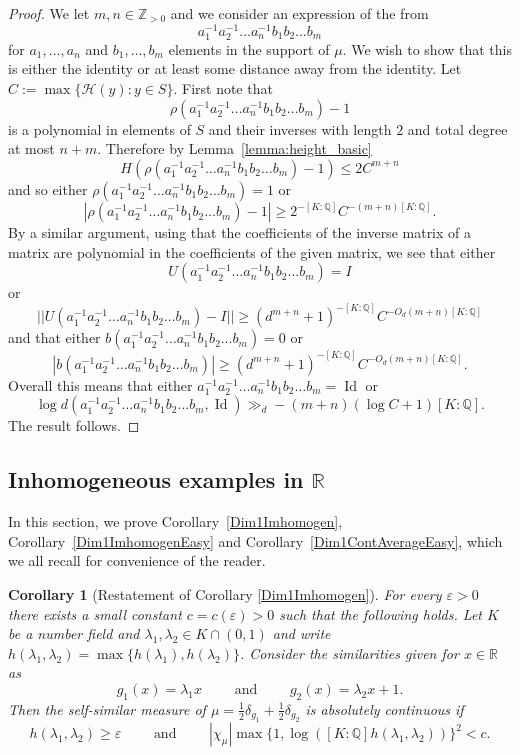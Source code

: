 \documentclass[10pt, english,oneside,reqno]{amsart}
\newtheorem*{corollary*}{Corollary}
\theoremstyle{plain}
\theoremstyle{remark}
\numberwithin{equation}{section}
\numberwithin{figure}{section}
\DeclareMathOperator{\id}{Id}
\newcommand{\eps}{\varepsilon}
\newcommand{\Q}{\mathbb{Q}}
\newcommand{\R}{\mathbb{R}}
\begin{document}
\begin{proof}
    We let $m, n \in \mathbb{Z}_{>0}$ and we consider an expression of the from $$a_1^{-1} a_2^{-1} \dots a_n^{-1} b_1 b_2 \dots b_m$$ for $a_1, \ldots , a_n$ and $b_1, \ldots , b_m$ elements in the support of $\mu$. We wish to show that this is either the identity or at least some distance away from the identity. Let $C := \max\{\mathcal{H}(y) : y \in S \}$. First note that $$\rho(a_1^{-1} a_2^{-1} \dots a_n^{-1} b_1 b_2 \dots b_m) - 1$$ is a polynomial in elements of $S$ and their inverses with length $2$ and total degree at most $n+m$. Therefore by Lemma~\ref{lemma:height_basic} $$H(\rho(a_1^{-1} a_2^{-1} \dots a_n^{-1} b_1 b_2 \dots b_m) - 1) \leq 2 C^{m+n}$$
		and so either $\rho(a_1^{-1} a_2^{-1} \dots a_n^{-1} b_1 b_2 \dots b_m) = 1$ or $$|\rho(a_1^{-1} a_2^{-1} \dots a_n^{-1} b_1 b_2 \dots b_m) - 1| \geq 2^{-[K:\mathbb{Q}]} C^{-(m+n)[K:\mathbb{Q}]}.$$
		By a similar argument, using that the coefficients of the inverse matrix of a matrix are polynomial in the coefficients of the given matrix, we see that either $$U(a_1^{-1} a_2^{-1} \dots a_n^{-1} b_1 b_2 \dots b_m) = I$$ or $$||U(a_1^{-1} a_2^{-1} \dots a_n^{-1} b_1 b_2 \dots b_m) - I|| \geq  (d^{m+n} + 1)^{-[K:\mathbb{Q}]} C^{-O_d(m+n)[K:\mathbb{Q}]}$$
		and that either $b(a_1^{-1} a_2^{-1} \dots a_n^{-1} b_1 b_2 \dots b_m) = 0$ or $$|b(a_1^{-1} a_2^{-1} \dots a_n^{-1} b_1 b_2 \dots b_m)| \geq  (d^{m+n} + 1)^{-[K:\mathbb{Q}]} C^{-O_d(m+n)[K:\mathbb{Q}]}.$$ Overall this means that either $a_1^{-1} a_2^{-1} \dots a_n^{-1} b_1 b_2 \dots b_m = \id$ or $$\log d(a_1^{-1} a_2^{-1} \dots a_n^{-1} b_1 b_2 \dots b_m, \id) \gg_d -(m + n)(\log C + 1)[K:\mathbb{Q}].$$ The result follows.
\end{proof}



\subsection{Inhomogeneous examples in $\R$}

In this section, we prove Corollary~\ref{Dim1Imhomogen}, Corollary~\ref{Dim1ImhomogenEasy} and Corollary~\ref{Dim1ContAverageEasy}, which we all recall for convenience of the reader.

\begin{corollary*}[Restatement of Corollary \ref{Dim1Imhomogen}]
		For every $\eps > 0$ there exists a small constant $c = c(\eps) > 0$ such that the following holds. Let $K$ be a number field and $\lambda_1,\lambda_2 \in K \cap (0,1)$ and write $h(\lambda_1,\lambda_2) = \max\{ h(\lambda_1), h(\lambda_2) \}$. Consider the similarities given for $x \in \R$ as $$g_1(x) = \lambda_1 x \quad\quad \text{ and } \quad\quad g_2(x) = \lambda_2 x + 1.$$ Then the self-similar measure of $\mu = \frac{1}{2}\delta_{g_1} + \frac{1}{2}\delta_{g_2}$ is absolutely continuous if $$ h(\lambda_1,\lambda_2) \geq \eps \quad\quad \text{ and } \quad\quad  |\chi_{\mu}| \max\{ 1, \log ([K:\Q] h(\lambda_1,\lambda_2) ) \} ^2 < c.$$
	\end{corollary*}
\end{document}
